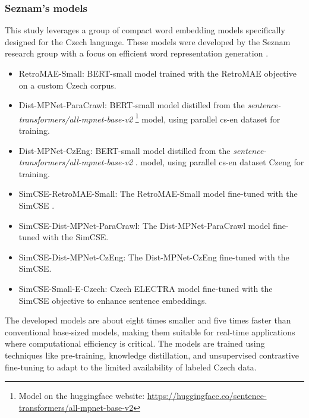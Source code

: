 \subsubsection{Seznam's models} \label{model:seznam}
This study leverages a group of compact word embedding models specifically designed for the Czech language.
These models were developed by the Seznam research group with a focus on efficient word representation generation \cite{seznam-models}.

\begin{itemize}
  \item RetroMAE-Small: \ac{BERT}-small model trained with the \ac{RetroMAE} objective \cite{RetroMAE} on a custom Czech corpus.
  \item Dist-MPNet-ParaCrawl: \ac{BERT}-small model distilled from the \textit{sentence-transformers/all-mpnet-base-v2} \footnote{\label{hf_all-mpnet-base-v2} Model on the huggingface website: \url{https://huggingface.co/sentence-transformers/all-mpnet-base-v2}} model, using parallel cs-en dataset  \cite{ParaCrawl} for training.
  \item Dist-MPNet-CzEng: \ac{BERT}-small model distilled from the \textit{sentence-transformers/all-mpnet-base-v2}  . model, using parallel cs-en dataset Czeng \cite{CzEng_dataset} for training.
  \item SimCSE-RetroMAE-Small: The \ac{RetroMAE}-Small model fine-tuned with the \ac{SimCSE} \cite{SimCSE}.
  \item SimCSE-Dist-MPNet-ParaCrawl: The Dist-MPNet-ParaCrawl model fine-tuned with the \ac{SimCSE}.
  \item SimCSE-Dist-MPNet-CzEng: The Dist-MPNet-CzEng fine-tuned with the \ac{SimCSE}.
  \item SimCSE-Small-E-Czech: Czech ELECTRA model \cite{small-e-czech} fine-tuned with the \ac{SimCSE} objective to enhance sentence embeddings.
\end{itemize}

The developed models are about eight times smaller and five times faster than conventional base-sized models, making them suitable for real-time applications where computational efficiency is critical.
The models are trained using techniques like pre-training, knowledge distillation, and unsupervised contrastive fine-tuning to adapt to the limited availability of labeled Czech data.


